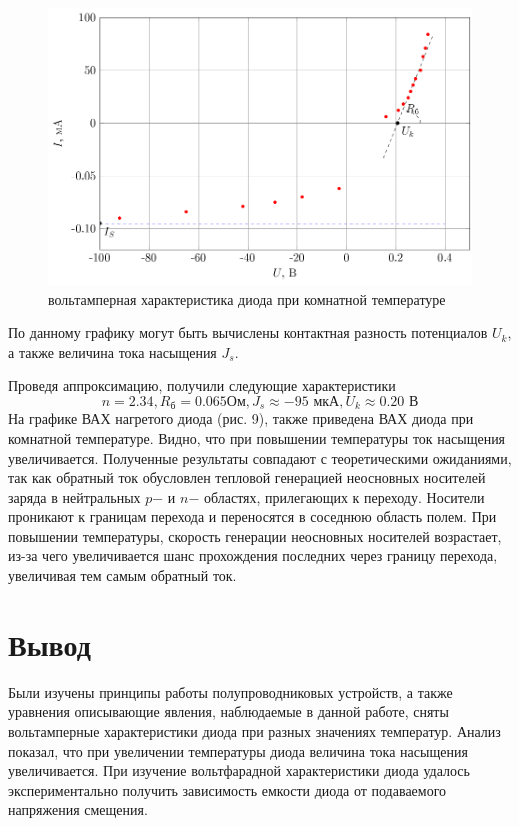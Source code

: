 \begin{figure}[H]
	\centering
	\includegraphics[width=\linewidth]{plots/plots3}
	\caption{вольтамперная характеристика диода при комнатной температуре}
	\label{fig:9}
\end{figure}
По данному графику могут быть вычислены контактная разность потенциалов $U_k$, а также величина тока насыщения $J_s$.

Проведя аппроксимацию, получили следующие характеристики
$$n = 2.34, R_\text{б} = 0.065 \text{Ом}, J_s \approx -95 \text{ мкА}, U_k \approx 0.20 \text{ В}$$
На графике ВАХ нагретого диода (рис. 9), также приведена ВАХ диода при комнатной температуре. Видно, что при повышении температуры ток насыщения увеличивается. Полученные результаты совпадают с теоретическими ожиданиями, так как обратный ток обусловлен тепловой генерацией неосновных носителей заряда в нейтральных $p$− и
$n$− областях, прилегающих к переходу. Носители проникают к границам перехода и переносятся в соседнюю область полем. При повышении температуры, скорость генерации
неосновных носителей возрастает, из-за чего увеличивается шанс прохождения последних
через границу перехода, увеличивая тем самым обратный ток.
\section{Вывод}
Были изучены принципы работы полупроводниковых устройств, а также уравнения описывающие явления, наблюдаемые в данной работе, сняты вольтамперные характеристики диода при разных значениях температур. Анализ показал, что при увеличении температуры диода величина тока насыщения увеличивается. При изучение вольтфарадной характеристики диода удалось экспериментально получить зависимость емкости диода от подаваемого напряжения смещения. 

